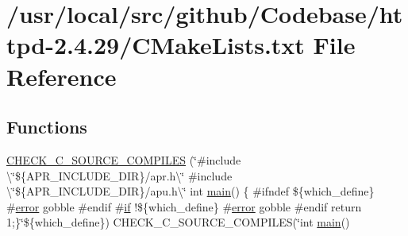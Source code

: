 \hypertarget{CMakeLists_8txt}{}\section{/usr/local/src/github/\+Codebase/httpd-\/2.4.29/\+C\+Make\+Lists.txt File Reference}
\label{CMakeLists_8txt}
\subsection*{Functions}
\begin{DoxyCompactItemize}
\item 
\hyperlink{CMakeLists_8txt_aead81ed16e7122477a43c587db6eb5bc}{C\+H\+E\+C\+K\+\_\+\+C\+\_\+\+S\+O\+U\+R\+C\+E\+\_\+\+C\+O\+M\+P\+I\+L\+ES} (\char`\"{}\#include \textbackslash{}\char`\"{}\$\{A\+P\+R\+\_\+\+I\+N\+C\+L\+U\+D\+E\+\_\+\+D\+IR\}/apr.\+h\textbackslash{}\char`\"{}
      \#include \textbackslash{}\char`\"{}\$\{A\+P\+R\+\_\+\+I\+N\+C\+L\+U\+D\+E\+\_\+\+D\+IR\}/apu.\+h\textbackslash{}\char`\"{}
      int \hyperlink{time-sem_8c_a70db8bd1d499619f7ff9c1ca2ff3c8df}{main}() \{
      \#ifndef \$\{which\+\_\+define\}
      \#\hyperlink{pcre_8txt_a49f154ded02555c4d15e7861acf2e434}{error} gobble
      \#endif
      \#\hyperlink{util__expr__scan_8c_aa1a71763978093648dffef60b56f7447}{if} !\$\{which\+\_\+define\}
      \#\hyperlink{pcre_8txt_a49f154ded02555c4d15e7861acf2e434}{error} gobble
      \#endif
      return 1;\}\char`\"{}\$\{which\+\_\+define\}) C\+H\+E\+C\+K\+\_\+\+C\+\_\+\+S\+O\+U\+R\+C\+E\+\_\+\+C\+O\+M\+P\+I\+L\+ES(\char`\"{}int \hyperlink{time-sem_8c_a70db8bd1d499619f7ff9c1ca2ff3c8df}{main}() 
\item 

\end{DoxyCompactItemize}
